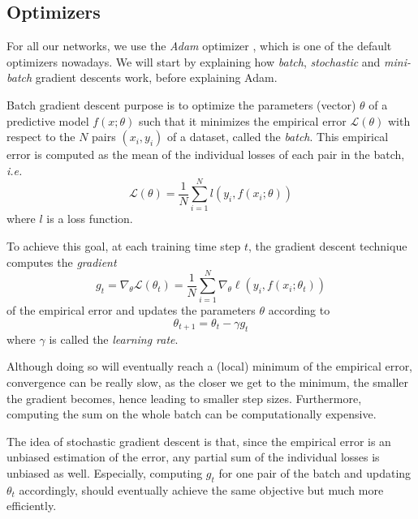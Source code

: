 \documentclass[twocolumn,superscriptaddress,aps,nofootinbib]{revtex4-1}
\begin{document}
\subsection{Optimizers}

For all our networks, we use the \emph{Adam} optimizer \cite{kingma2014adam}, which is one of the default optimizers nowadays. We will start by explaining how \emph{batch}, \emph{stochastic} and \emph{mini-batch} gradient descents work, before explaining Adam.

Batch gradient descent purpose is to optimize the parameters (vector) $\theta$ of a predictive model $f(x; \theta)$ such that it minimizes the empirical error $\mathcal{L}(\theta)$ with respect to the $N$ pairs $(x_i, y_i)$ of a dataset, called the \emph{batch}. This empirical error is computed as the mean of the individual losses of each pair in the batch, \emph{i.e.}
\begin{equation}\label{eq:empirical_error}
    \mathcal{L}(\theta) = \frac{1}{N}\sum_{i=1}^N l(y_i, f(x_i; \theta))
\end{equation}
where $l$ is a loss function.

To achieve this goal, at each training time step $t$, the gradient descent technique computes the \emph{gradient}
\begin{equation}
    g_{t} = \nabla_{\theta} \mathcal{L}(\theta_t) = \frac{1}{N} \sum_{i=1}^{N} \nabla_{\theta} \ell\left(y_{i}, f\left(x_{i} ; \theta_{t}\right)\right)
\end{equation}
of the empirical error and updates the parameters $\theta$ according to
\begin{equation}
    \theta_{t+1} = \theta_{t} - \gamma g_{t}
\end{equation}
where $\gamma$ is called the \emph{learning rate}.

Although doing so will eventually reach a (local) minimum of the empirical error, convergence can be really slow, as the closer we get to the minimum, the smaller the gradient becomes, hence leading to smaller step sizes. Furthermore, computing the sum on the whole batch can be computationally expensive.

The idea of stochastic gradient descent is that, since the empirical error is an unbiased estimation of the error, any partial sum of the individual losses is unbiased as well. Especially, computing $g_t$ for one pair of the batch and updating $\theta_t$ accordingly, should eventually achieve the same objective but much more efficiently.
\end{document}
